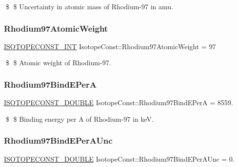 \$ \$ Uncertainty in atomic mass of Rhodium-\/97 in amu. \mbox{\label{group___isotope_const-_rhodium-_rh97_ga7c482a76b55ca0817d141ba4859227bb}} 
\subsubsection{\texorpdfstring{Rhodium97\+Atomic\+Weight}{Rhodium97AtomicWeight}}
{\footnotesize\ttfamily \mbox{\hyperlink{group___isotope_const-_macros_ga5f18360b3e99483a35c32d789e62621c}{I\+S\+O\+T\+O\+P\+E\+C\+O\+N\+S\+T\+\_\+\+I\+NT}} Isotope\+Const\+::\+Rhodium97\+Atomic\+Weight = 97}

\$ \$ Atomic weight of Rhodium-\/97. \mbox{\label{group___isotope_const-_rhodium-_rh97_gae394c099219b3334504863e5f8a26e6c}} 
\subsubsection{\texorpdfstring{Rhodium97\+Bind\+E\+PerA}{Rhodium97BindEPerA}}
{\footnotesize\ttfamily \mbox{\hyperlink{group___isotope_const-_macros_ga8f45a7272ce02c0b4c65c44636ed719a}{I\+S\+O\+T\+O\+P\+E\+C\+O\+N\+S\+T\+\_\+\+D\+O\+U\+B\+LE}} Isotope\+Const\+::\+Rhodium97\+Bind\+E\+PerA = 8559.}

\$ \$ Binding energy per A of Rhodium-\/97 in keV. \mbox{\label{group___isotope_const-_rhodium-_rh97_ga288981e5230b80c2564c108b1f45a687}} 
\subsubsection{\texorpdfstring{Rhodium97\+Bind\+E\+Per\+A\+Unc}{Rhodium97BindEPerAUnc}}
{\footnotesize\ttfamily \mbox{\hyperlink{group___isotope_const-_macros_ga8f45a7272ce02c0b4c65c44636ed719a}{I\+S\+O\+T\+O\+P\+E\+C\+O\+N\+S\+T\+\_\+\+D\+O\+U\+B\+LE}} Isotope\+Const\+::\+Rhodium97\+Bind\+E\+Per\+A\+Unc = 0.}

